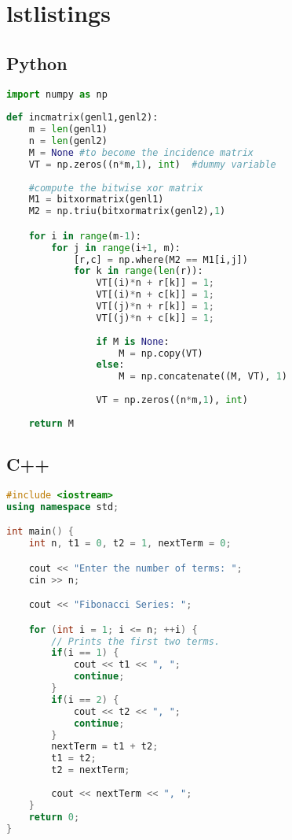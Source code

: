 \documentclass[10pt,titlepage]{article}
\begin{document}
\section{lstlistings}

\subsection{Python}
\begin{lstlisting}[language=python]
import numpy as np
    
def incmatrix(genl1,genl2):
    m = len(genl1)
    n = len(genl2)
    M = None #to become the incidence matrix
    VT = np.zeros((n*m,1), int)  #dummy variable
    
    #compute the bitwise xor matrix
    M1 = bitxormatrix(genl1)
    M2 = np.triu(bitxormatrix(genl2),1) 

    for i in range(m-1):
        for j in range(i+1, m):
            [r,c] = np.where(M2 == M1[i,j])
            for k in range(len(r)):
                VT[(i)*n + r[k]] = 1;
                VT[(i)*n + c[k]] = 1;
                VT[(j)*n + r[k]] = 1;
                VT[(j)*n + c[k]] = 1;
                
                if M is None:
                    M = np.copy(VT)
                else:
                    M = np.concatenate((M, VT), 1)
                
                VT = np.zeros((n*m,1), int)
    
    return M
\end{lstlisting}

\subsection{C++}

\begin{lstlisting}[language=c++]
#include <iostream>
using namespace std;

int main() {
    int n, t1 = 0, t2 = 1, nextTerm = 0;

    cout << "Enter the number of terms: ";
    cin >> n;

    cout << "Fibonacci Series: ";

    for (int i = 1; i <= n; ++i) {
        // Prints the first two terms.
        if(i == 1) {
            cout << t1 << ", ";
            continue;
        }
        if(i == 2) {
            cout << t2 << ", ";
            continue;
        }
        nextTerm = t1 + t2;
        t1 = t2;
        t2 = nextTerm;
        
        cout << nextTerm << ", ";
    }
    return 0;
}
\end{lstlisting}
\end{document}
